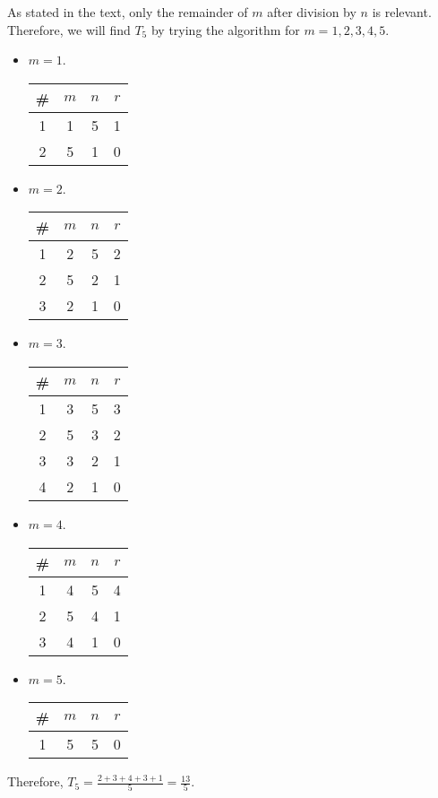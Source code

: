 \documentclass[letterpaper, reqno,11pt]{article}
\begin{document}
 As stated in the text, only the remainder of $m$ after division by $n$ is relevant. \\
Therefore, we will find $T_5$ by trying the algorithm for $m=1,2,3,4,5$.
\begin{itemize}
    \item $m=1$. \\
        \begin{tabular}{c | c c c}
            \# & $m$ & $n$ & $r$ \\
            \hline
            1 & 1 & 5 & 1 \\
            2 & 5 & 1 & 0
        \end{tabular}
    \item $m=2$. \\
        \begin{tabular}{c | c c c}
            \# & $m$ & $n$ & $r$ \\
            \hline
            1 & 2 & 5 & 2 \\
            2 & 5 & 2 & 1 \\
            3 & 2 & 1 & 0
        \end{tabular}
    \item $m=3$. \\
        \begin{tabular}{c | c c c}
            \# & $m$ & $n$ & $r$ \\
            \hline
            1 & 3 & 5 & 3 \\
            2 & 5 & 3 & 2 \\
            3 & 3 & 2 & 1 \\
            4 & 2 & 1 & 0
        \end{tabular}
    \item $m=4$. \\
        \begin{tabular}{c | c c c}
            \# & $m$ & $n$ & $r$ \\
            \hline
            1 & 4 & 5 & 4 \\
            2 & 5 & 4 & 1 \\
            3 & 4 & 1 & 0
        \end{tabular}
    \item $m=5$. \\
        \begin{tabular}{c | c c c}
            \# & $m$ & $n$ & $r$ \\
            \hline
            1 & 5 & 5 & 0
        \end{tabular}
\end{itemize}
Therefore, $T_5=\frac{2+3+4+3+1}{5}=\frac{13}{5}$.
\end{document}
